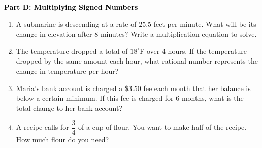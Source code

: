 \documentclass[12pt, letterpaper, fleqn]{article}
\begin{document}
\newpage

\begin{tcolorbox}[colback=customteal!20]
\large\textcolor{black}{\textbf{Part D: Multiplying Signed Numbers}}
\end{tcolorbox}

\vspace{3mm}

\begin{enumerate}[itemsep=2.5cm, leftmargin=0.6cm, resume]
\item A submarine is descending at a rate of $25.5$ feet per minute. What will be its change in elevation after $8$ minutes? Write a multiplication equation to solve.
\item The temperature dropped a total of $18^\circ$F over $4$ hours. If the temperature dropped by the same amount each hour, what rational number represents the change in temperature per hour?
\item Maria's bank account is charged a $\$3.50$ fee each month that her balance is below a certain minimum. If this fee is charged for $6$ months, what is the total change to her bank account?
\item A recipe calls for $\dfrac{3}{4}$ of a cup of flour. You want to make half of the recipe. How much flour do you need?
\end{enumerate}
\end{document}
